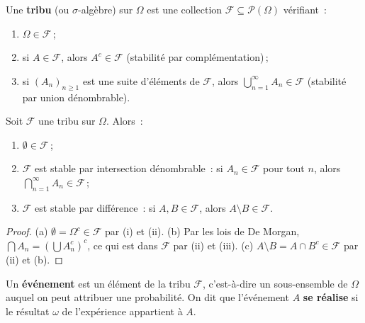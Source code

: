 \begin{definition}
\label{def:tribu}
Une \textbf{tribu} (ou $\sigma$-alg\`ebre) sur $\Omega$ est une collection
$\mathcal{F} \subseteq \mathcal{P}(\Omega)$ v\'erifiant~:
\begin{enumerate}[label=(\roman*)]
    \item $\Omega \in \mathcal{F}$\,;
    \item si $A \in \mathcal{F}$, alors $A^c \in \mathcal{F}$ \quad
          (stabilit\'e par compl\'ementation)\,;
    \item si $(A_n)_{n \geq 1}$ est une suite d'\'el\'ements de $\mathcal{F}$, alors
          $\displaystyle\bigcup_{n=1}^{\infty} A_n \in \mathcal{F}$ \quad
          (stabilit\'e par union d\'enombrable).
\end{enumerate}
\end{definition}

\begin{proposition}
Soit $\mathcal{F}$ une tribu sur $\Omega$. Alors~:
\begin{enumerate}[label=(\alph*)]
    \item $\emptyset \in \mathcal{F}$\,;
    \item $\mathcal{F}$ est stable par intersection d\'enombrable~:
          si $A_n \in \mathcal{F}$ pour tout $n$, alors
          $\bigcap_{n=1}^{\infty} A_n \in \mathcal{F}$\,;
    \item $\mathcal{F}$ est stable par diff\'erence~: si $A, B \in \mathcal{F}$,
          alors $A \setminus B \in \mathcal{F}$.
\end{enumerate}
\end{proposition}

\begin{proof}
(a) $\emptyset = \Omega^c \in \mathcal{F}$ par (i) et (ii).
(b) Par les lois de De Morgan, $\bigcap A_n = \left(\bigcup A_n^c\right)^c$,
ce qui est dans $\mathcal{F}$ par (ii) et (iii).
(c) $A \setminus B = A \cap B^c \in \mathcal{F}$ par (ii) et (b).
\end{proof}

\begin{definition}[\'Ev\'enement]
Un \textbf{\'ev\'enement} est un \'el\'ement de la tribu $\mathcal{F}$, c'est-\`a-dire
un sous-ensemble de $\Omega$ auquel on peut attribuer une probabilit\'e. On dit que
l'\'ev\'enement $A$ \textbf{se r\'ealise} si le r\'esultat $\omega$ de l'exp\'erience
appartient \`a $A$.
\end{definition}

